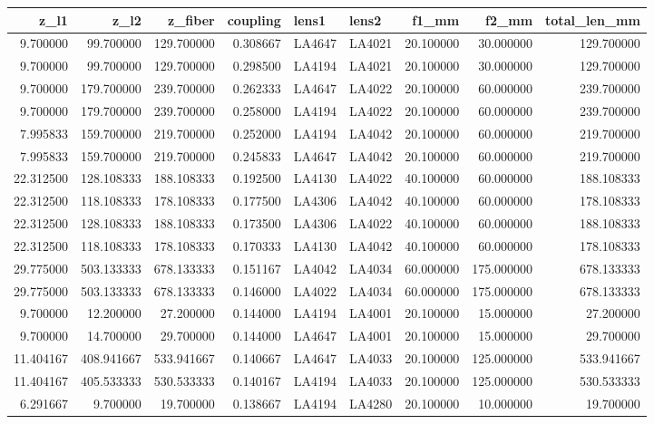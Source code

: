 \begin{tabular}{rrrrllrrr}
\toprule
z_l1 & z_l2 & z_fiber & coupling & lens1 & lens2 & f1_mm & f2_mm & total_len_mm \\
\midrule
9.700000 & 99.700000 & 129.700000 & 0.308667 & LA4647 & LA4021 & 20.100000 & 30.000000 & 129.700000 \\
9.700000 & 99.700000 & 129.700000 & 0.298500 & LA4194 & LA4021 & 20.100000 & 30.000000 & 129.700000 \\
9.700000 & 179.700000 & 239.700000 & 0.262333 & LA4647 & LA4022 & 20.100000 & 60.000000 & 239.700000 \\
9.700000 & 179.700000 & 239.700000 & 0.258000 & LA4194 & LA4022 & 20.100000 & 60.000000 & 239.700000 \\
7.995833 & 159.700000 & 219.700000 & 0.252000 & LA4194 & LA4042 & 20.100000 & 60.000000 & 219.700000 \\
7.995833 & 159.700000 & 219.700000 & 0.245833 & LA4647 & LA4042 & 20.100000 & 60.000000 & 219.700000 \\
22.312500 & 128.108333 & 188.108333 & 0.192500 & LA4130 & LA4022 & 40.100000 & 60.000000 & 188.108333 \\
22.312500 & 118.108333 & 178.108333 & 0.177500 & LA4306 & LA4042 & 40.100000 & 60.000000 & 178.108333 \\
22.312500 & 128.108333 & 188.108333 & 0.173500 & LA4306 & LA4022 & 40.100000 & 60.000000 & 188.108333 \\
22.312500 & 118.108333 & 178.108333 & 0.170333 & LA4130 & LA4042 & 40.100000 & 60.000000 & 178.108333 \\
29.775000 & 503.133333 & 678.133333 & 0.151167 & LA4042 & LA4034 & 60.000000 & 175.000000 & 678.133333 \\
29.775000 & 503.133333 & 678.133333 & 0.146000 & LA4022 & LA4034 & 60.000000 & 175.000000 & 678.133333 \\
9.700000 & 12.200000 & 27.200000 & 0.144000 & LA4194 & LA4001 & 20.100000 & 15.000000 & 27.200000 \\
9.700000 & 14.700000 & 29.700000 & 0.144000 & LA4647 & LA4001 & 20.100000 & 15.000000 & 29.700000 \\
11.404167 & 408.941667 & 533.941667 & 0.140667 & LA4647 & LA4033 & 20.100000 & 125.000000 & 533.941667 \\
11.404167 & 405.533333 & 530.533333 & 0.140167 & LA4194 & LA4033 & 20.100000 & 125.000000 & 530.533333 \\
6.291667 & 9.700000 & 19.700000 & 0.138667 & LA4194 & LA4280 & 20.100000 & 10.000000 & 19.700000 \\

\end{tabular}
